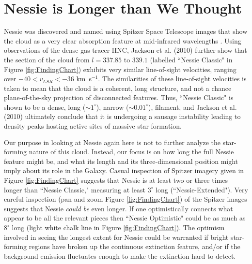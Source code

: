 \section{Nessie is Longer than We Thought}
\label{longer}

Nessie was discovered and named 
using Spitzer Space Telescope images that show the cloud as a very clear absorption feature at mid-infrared wavelengths
\cite{Jackson2010}.  Using observations of the dense-gas tracer HNC, Jackson
et al. (2010) further show that the section of the cloud from $l=337.85$ to $339.1$
(labelled ``Nessie Classic" in Figure \ref{fig:FindingChart}) exhibits very similar line-of-sight
velocities, ranging over $-40<v_{LSR}<-36$ km\ s$^{-1}$.
The similarities of these line-of-sight velocities is taken to mean that
the cloud is a coherent, long structure, and not a chance
plane-of-the-sky projection of disconnected features. Thus, ``Nessie
Classic" is shown to be a dense,  long ($\sim 1^\circ$), narrow ($\sim 0.01^\circ$),
filament, and Jackson et al. (2010) ultimately conclude that it is undergoing a
sausage instability leading to density peaks hosting active sites of
massive star formation.

Our purpose in looking at Nessie again here is not to further analyze the star-forming nature of this cloud. Instead, our focus is on how long the full Nessie feature might be, and what its length and its three-dimensional position might imply about its role in the Galaxy. Casual inspection of Spitzer imagery given in Figure \ref{fig:FindingChart} suggests that Nessie is at least two or three times longer than ``Nessie Classic," measuring at least $3^\circ$ long (``Nessie-Extended"). Very careful
inspection (pan and zoom Figure \ref{fig:FindingChart}) of the Spitzer images suggests
that Nessie \emph{could be} even longer.  If
one optimistically connects what appear to be all the relevant pieces
then ``Nessie Optimistic" could be as much as $8^\circ$ long (light white chalk line in Figure \ref{fig:FindingChart}). The optimism involved in seeing the longest extent for Nessie could  be warranted if bright star-forming regions have broken up the continuous extinction feature, and/or if the background emission fluctuates enough to make the extinction  hard to detect.

